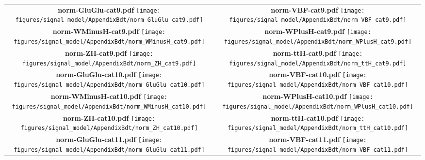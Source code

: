 \begin{longtable}{|c|c|}
{}
 \\
\hline
\parbox{0.47\textwidth}{
\centering
{\bfseries norm-GluGlu-cat9.pdf}
\texttt{[image: figures/signal\_model/AppendixBdt/norm\_GluGlu\_cat9.pdf]}
}
 & \parbox{0.47\textwidth}{
\centering
{\bfseries norm-VBF-cat9.pdf}
\texttt{[image: figures/signal\_model/AppendixBdt/norm\_VBF\_cat9.pdf]}
}
 \\
\hline
\parbox{0.47\textwidth}{
\centering
{\bfseries norm-WMinusH-cat9.pdf}
\texttt{[image: figures/signal\_model/AppendixBdt/norm\_WMinusH\_cat9.pdf]}
}
 & \parbox{0.47\textwidth}{
\centering
{\bfseries norm-WPlusH-cat9.pdf}
\texttt{[image: figures/signal\_model/AppendixBdt/norm\_WPlusH\_cat9.pdf]}
}
 \\
\hline
\parbox{0.47\textwidth}{
\centering
{\bfseries norm-ZH-cat9.pdf}
\texttt{[image: figures/signal\_model/AppendixBdt/norm\_ZH\_cat9.pdf]}
}
 & \parbox{0.47\textwidth}{
\centering
{\bfseries norm-ttH-cat9.pdf}
\texttt{[image: figures/signal\_model/AppendixBdt/norm\_ttH\_cat9.pdf]}
}
 \\
\hline
\parbox{0.47\textwidth}{
\centering
{\bfseries norm-GluGlu-cat10.pdf}
\texttt{[image: figures/signal\_model/AppendixBdt/norm\_GluGlu\_cat10.pdf]}
}
 & \parbox{0.47\textwidth}{
\centering
{\bfseries norm-VBF-cat10.pdf}
\texttt{[image: figures/signal\_model/AppendixBdt/norm\_VBF\_cat10.pdf]}
}
 \\
\hline
\parbox{0.47\textwidth}{
\centering
{\bfseries norm-WMinusH-cat10.pdf}
\texttt{[image: figures/signal\_model/AppendixBdt/norm\_WMinusH\_cat10.pdf]}
}
 & \parbox{0.47\textwidth}{
\centering
{\bfseries norm-WPlusH-cat10.pdf}
\texttt{[image: figures/signal\_model/AppendixBdt/norm\_WPlusH\_cat10.pdf]}
}
 \\
\hline
\parbox{0.47\textwidth}{
\centering
{\bfseries norm-ZH-cat10.pdf}
\texttt{[image: figures/signal\_model/AppendixBdt/norm\_ZH\_cat10.pdf]}
}
 & \parbox{0.47\textwidth}{
\centering
{\bfseries norm-ttH-cat10.pdf}
\texttt{[image: figures/signal\_model/AppendixBdt/norm\_ttH\_cat10.pdf]}
}
 \\
\hline
\parbox{0.47\textwidth}{
\centering
{\bfseries norm-GluGlu-cat11.pdf}
\texttt{[image: figures/signal\_model/AppendixBdt/norm\_GluGlu\_cat11.pdf]}
}
 & \parbox{0.47\textwidth}{
\centering
{\bfseries norm-VBF-cat11.pdf}
\texttt{[image: figures/signal\_model/AppendixBdt/norm\_VBF\_cat11.pdf]}
}
\end{longtable}
